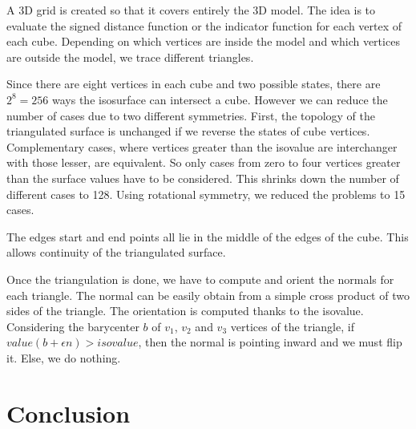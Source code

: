 \documentclass[a4paper]{article}
\begin{document}
A 3D grid is created so that it covers entirely the 3D model. The idea is to evaluate the signed distance function or the indicator function for each vertex of each cube. Depending on which vertices are inside the model and which vertices are outside the model, we trace different triangles.

Since there are eight vertices in each cube and two possible states, there are $2^8 = 256$ ways the isosurface can intersect a cube. However we can reduce the number of cases due to two different symmetries. First, the topology of the triangulated surface is unchanged if we reverse the states of cube vertices. Complementary cases, where vertices greater than the isovalue are interchanger with those lesser, are equivalent. So only cases from zero to four vertices greater than the surface values have to be considered. This shrinks down the number of different cases to 128. Using rotational symmetry, we reduced the problems to 15 cases.


The edges start and end points all lie in the middle of the edges of the cube. This allows continuity of the triangulated surface.

Once the triangulation is done, we have to compute and orient the normals for each triangle. The normal can be easily obtain from a simple cross product of two sides of the triangle. The orientation is computed thanks to the isovalue. Considering the barycenter $b$ of $v_1$, $v_2$ and $v_3$ vertices of the triangle, if $value(b + \epsilon n) > isovalue$, then the normal is pointing inward and we must flip it. Else, we do nothing.

\section*{Conclusion}
\end{document}
